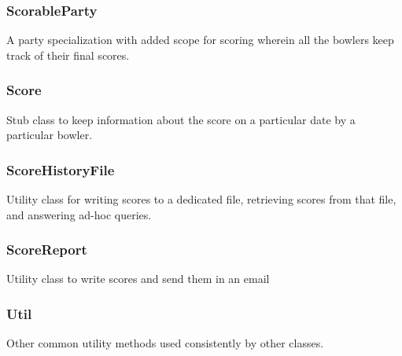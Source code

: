 \subsubsection{ScorableParty}
A party specialization with added scope for scoring wherein all the bowlers keep track of their final scores.

\subsubsection{Score}
Stub class to keep information about the score on a particular date by a particular bowler.

\subsubsection{ScoreHistoryFile}
Utility class for writing scores to a dedicated file, retrieving scores from that file, and answering ad-hoc queries.

\subsubsection{ScoreReport}
Utility class to write scores and send them in an email

\subsubsection{Util}
Other common utility methods used consistently by other classes.